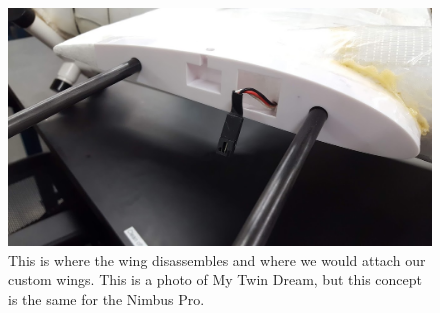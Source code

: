 \documentclass[]{auvsi_doc}
\begin{document}
\begin{figure}[h!]
	\centering
	\includegraphics[width=.8\columnwidth]{figs/wing}
	\caption{This is where the wing disassembles and where we would attach our custom wings. This is a photo of My Twin Dream, but this concept is the same for the Nimbus Pro.}
	\label{fig:wing}    
\end{figure}
\end{document}
